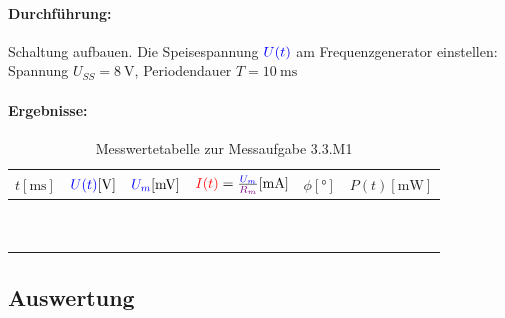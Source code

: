 \documentclass[11pt,a4paper,titlepage,parskip=half]{scrreprt}
\begin{document}
                   \paragraph{Durchführung:} Schaltung aufbauen. Die Speisespannung $\textcolor{blue}{U(t)}$ am Frequenzgenerator einstellen: Spannung $U_{SS} = \SI{8}{\volt}$, Periodendauer  $T = \SI{10}{\milli\second}$ 
                   \paragraph{Ergebnisse:}
                   \begin{center}
                       \begin{table}[!hbtp]
                           \caption{Messwertetabelle zur Messaufgabe 3.3.M1}
                           \label{tbl:messergebnisse3.1}
                           \renewcommand{\arraystretch}{1.6}
                           \begin{center}
                               \begin{tabular}{c|c|c|c|c|c}
									$t [\si{\milli\second}]$ & $\textcolor{blue}{U(t)} [\si{\volt}]$ & $\textcolor{blue}{U_m} [\si{\milli\volt}]$ & $\textcolor{red}{I(t)} = \frac{\textcolor{blue}{U_m}}{\textcolor{violet}{R_m}} [\si{\milli\ampere}]$ & $\phi [°]$ & $P(t) [\si{\milli\watt}]$\\ \hline
									\qquad\qquad\qquad & \qquad\qquad\qquad & \qquad\qquad\qquad & \qquad\qquad\qquad & \qquad\qquad\qquad & \qquad\qquad\qquad\\\hline
									 &  &  &  &  & \\\hline
									 &  &  &  &  & \\\hline
									 &  &  &  &  & \\\hline
									 &  &  &  &  & \\\hline
									 &  &  &  &  & \\\hline
									 &  &  &  &  & \\\hline
									 &  &  &  &  & \\\hline
									 &  &  &  &  & \\\hline
									 &  &  &  &  & \\
							   \end{tabular}
                           \end{center}
                       \end{table}
                   \end{center}
                   
                   
                   \subsection{Auswertung}
\end{document}

